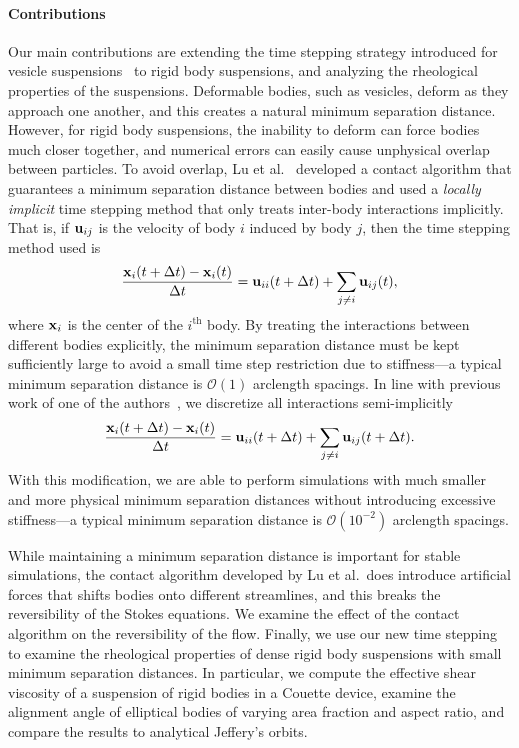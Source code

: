 \documentclass[AMA,STIX1COL]{WileyNJD-v2}
\begin{document}
\paragraph{Contributions} Our main contributions are extending the time
stepping strategy introduced for vesicle suspensions~\cite{Quaife2014}
to rigid body suspensions, and analyzing the rheological properties of
the suspensions.  Deformable bodies, such as vesicles, deform as they
approach one another, and this creates a natural minimum separation
distance.  However, for rigid body suspensions, the inability to deform
can force bodies much closer together, and numerical errors can easily
cause unphysical overlap between particles.  To avoid overlap, Lu et
al.~\cite{Lu2017} developed a contact algorithm that guarantees a
minimum separation distance between bodies and used a {\em locally
implicit} time stepping method that only treats inter-body interactions
implicitly.  That is, if ${\mathbf{u}}_{ij}$ is the velocity of body $i$ induced
by body $j$, then the time stepping method used is
\begin{align*}
  \frac{{\mathbf{x}}_i(t + \Delta t) -  {\mathbf{x}}_i(t)}{\Delta t} = 
    {\mathbf{u}}_{ii}(t+\Delta t) + \sum_{j \neq i} {\mathbf{u}}_{ij}(t),
\end{align*}
where ${\mathbf{x}}_i$ is the center of the $i^{\mathrm{th}}$ body.  By treating
the interactions between different bodies explicitly, the minimum
separation distance must be kept sufficiently large to avoid a small
time step restriction due to stiffness---a typical minimum separation
distance is $\mathcal{O}(1)$ arclength spacings.  In line with previous
work of one of the authors~\cite{Quaife2014}, we discretize all
interactions semi-implicitly
\begin{align*}
  \frac{{\mathbf{x}}_i(t + \Delta t) -  {\mathbf{x}}_i(t)}{\Delta t} = 
    {\mathbf{u}}_{ii}(t+\Delta t) + \sum_{j \neq i} {\mathbf{u}}_{ij}(t+\Delta t).
\end{align*}
With this modification, we are able to perform simulations with much
smaller and more physical minimum separation distances without
introducing excessive stiffness---a typical minimum separation distance
is $\mathcal{O}(10^{-2})$ arclength spacings.

While maintaining a minimum separation distance is important for stable
simulations, the contact algorithm developed by Lu et al.~does introduce
artificial forces that shifts bodies onto different streamlines, and
this breaks  the reversibility of the Stokes equations.  We examine the
effect of the contact algorithm on the reversibility of the flow.
Finally, we use our new time stepping to examine the rheological
properties of dense rigid body suspensions with small minimum separation
distances.  In particular, we compute the effective shear viscosity of a
suspension of rigid bodies in a Couette device, examine the alignment
angle of elliptical bodies of varying area fraction and aspect ratio,
and compare the results to analytical Jeffery's orbits.
\end{document}
